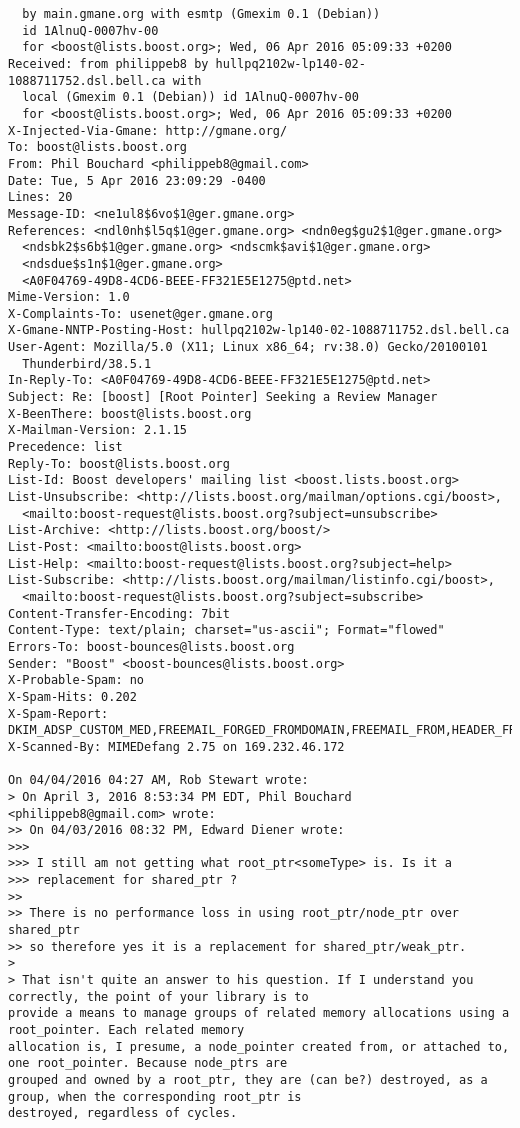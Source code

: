 \documentclass{report}
\begin{document}
\begin{problem}
{\begin{lstlisting}
  by main.gmane.org with esmtp (Gmexim 0.1 (Debian))
  id 1AlnuQ-0007hv-00
  for <boost@lists.boost.org>; Wed, 06 Apr 2016 05:09:33 +0200
Received: from philippeb8 by hullpq2102w-lp140-02-1088711752.dsl.bell.ca with
  local (Gmexim 0.1 (Debian)) id 1AlnuQ-0007hv-00
  for <boost@lists.boost.org>; Wed, 06 Apr 2016 05:09:33 +0200
X-Injected-Via-Gmane: http://gmane.org/
To: boost@lists.boost.org
From: Phil Bouchard <philippeb8@gmail.com>
Date: Tue, 5 Apr 2016 23:09:29 -0400
Lines: 20
Message-ID: <ne1ul8$6vo$1@ger.gmane.org>
References: <ndl0nh$l5q$1@ger.gmane.org> <ndn0eg$gu2$1@ger.gmane.org>
  <ndsbk2$s6b$1@ger.gmane.org> <ndscmk$avi$1@ger.gmane.org>
  <ndsdue$s1n$1@ger.gmane.org>
  <A0F04769-49D8-4CD6-BEEE-FF321E5E1275@ptd.net>
Mime-Version: 1.0
X-Complaints-To: usenet@ger.gmane.org
X-Gmane-NNTP-Posting-Host: hullpq2102w-lp140-02-1088711752.dsl.bell.ca
User-Agent: Mozilla/5.0 (X11; Linux x86_64; rv:38.0) Gecko/20100101
  Thunderbird/38.5.1
In-Reply-To: <A0F04769-49D8-4CD6-BEEE-FF321E5E1275@ptd.net>
Subject: Re: [boost] [Root Pointer] Seeking a Review Manager
X-BeenThere: boost@lists.boost.org
X-Mailman-Version: 2.1.15
Precedence: list
Reply-To: boost@lists.boost.org
List-Id: Boost developers' mailing list <boost.lists.boost.org>
List-Unsubscribe: <http://lists.boost.org/mailman/options.cgi/boost>,
  <mailto:boost-request@lists.boost.org?subject=unsubscribe>
List-Archive: <http://lists.boost.org/boost/>
List-Post: <mailto:boost@lists.boost.org>
List-Help: <mailto:boost-request@lists.boost.org?subject=help>
List-Subscribe: <http://lists.boost.org/mailman/listinfo.cgi/boost>,
  <mailto:boost-request@lists.boost.org?subject=subscribe>
Content-Transfer-Encoding: 7bit
Content-Type: text/plain; charset="us-ascii"; Format="flowed"
Errors-To: boost-bounces@lists.boost.org
Sender: "Boost" <boost-bounces@lists.boost.org>
X-Probable-Spam: no
X-Spam-Hits: 0.202
X-Spam-Report: DKIM_ADSP_CUSTOM_MED,FREEMAIL_FORGED_FROMDOMAIN,FREEMAIL_FROM,HEADER_FROM_DIFFERENT_DOMAINS
X-Scanned-By: MIMEDefang 2.75 on 169.232.46.172

On 04/04/2016 04:27 AM, Rob Stewart wrote:
> On April 3, 2016 8:53:34 PM EDT, Phil Bouchard <philippeb8@gmail.com> wrote:
>> On 04/03/2016 08:32 PM, Edward Diener wrote:
>>>
>>> I still am not getting what root_ptr<someType> is. Is it a
>>> replacement for shared_ptr ?
>>
>> There is no performance loss in using root_ptr/node_ptr over shared_ptr
>> so therefore yes it is a replacement for shared_ptr/weak_ptr.
>
> That isn't quite an answer to his question. If I understand you correctly, the point of your library is to
provide a means to manage groups of related memory allocations using a root_pointer. Each related memory
allocation is, I presume, a node_pointer created from, or attached to, one root_pointer. Because node_ptrs are
grouped and owned by a root_ptr, they are (can be?) destroyed, as a group, when the corresponding root_ptr is
destroyed, regardless of cycles.


\end{lstlisting}}
\end{problem}
\end{document}
